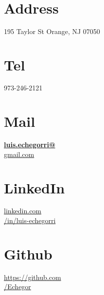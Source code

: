 \begin{aside}
~
~
~
~
~
  \section{Address}
    195 Taylor St 
    Orange, NJ 07050
    ~
    ~
  \section{Tel}
    973-246-2121
    ~
    ~
  \section{Mail}
    \href{mailto:luis.echegorri@gmail.com}{\textbf{luis.echegorri@\\}gmail.com}
    ~
    ~
  \section{LinkedIn}
    \href{https://www.linkedin.com/in/luis-echegorri}{linkedin.com\\/in/luis-echegorri}
    ~
    ~
  \section{Github}
    \href{https://github.com/Echegor}{https://github.com\\/Echegor}
    ~
    

\end{aside}

